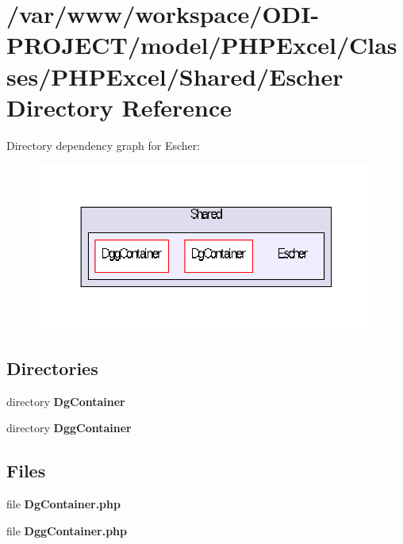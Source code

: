 \section{/var/www/workspace/\+O\+D\+I-\/\+P\+R\+O\+J\+E\+C\+T/model/\+P\+H\+P\+Excel/\+Classes/\+P\+H\+P\+Excel/\+Shared/\+Escher Directory Reference}
\label{dir_7ee6efe7a529f3637deb00384a745c6b}
Directory dependency graph for Escher\+:\nopagebreak
\begin{figure}[H]
\begin{center}
\leavevmode
\includegraphics[width=350pt]{dir_7ee6efe7a529f3637deb00384a745c6b_dep}
\end{center}
\end{figure}
\subsection*{Directories}
\begin{DoxyCompactItemize}
\item 
directory {\bf Dg\+Container}
\item 
directory {\bf Dgg\+Container}
\end{DoxyCompactItemize}
\subsection*{Files}
\begin{DoxyCompactItemize}
\item 
file {\bfseries Dg\+Container.\+php}
\item 
file {\bfseries Dgg\+Container.\+php}
\end{DoxyCompactItemize}
